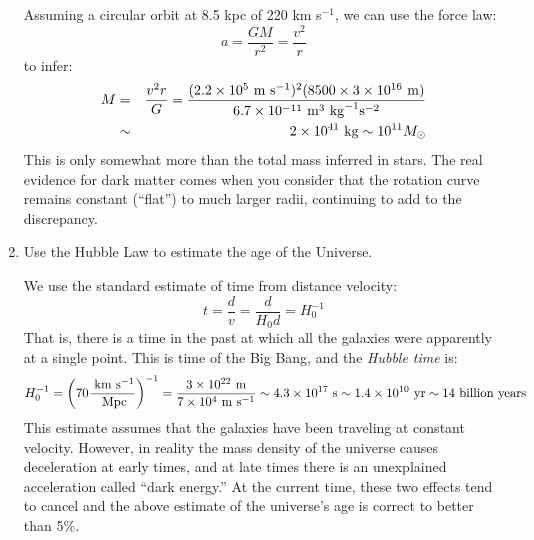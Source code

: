 \begin{enumerate}
\begin{answer}
  Assuming a circular orbit at 8.5 kpc of 220 km s$^{-1}$, we can use
  the force law:
  \begin{equation}
   a = \frac{GM}{r^2} = \frac{v^2}{r}
  \end{equation}
  to infer:
  \begin{eqnarray}
   M &=& \frac{v^2 r}{G} =  \frac{(2.2 \times 10^5 {\rm ~m} {\rm
       ~s}^{-1})^2 (8500 \times 3 \times 10^{16} {\rm ~m})}
   {6.7 \times 10^{-11} {\rm ~m}^3 {\rm ~kg}^{-1} {\rm s}^{-2}} \cr
   &\sim& 2\times 10^{41} {\rm ~kg} \sim 10^{11} M_\odot 
  \end{eqnarray}
  This is only somewhat more than the total mass inferred in stars. The
  real evidence for  dark matter comes when you consider that the
  rotation curve remains constant (``flat'') to much larger radii,
  continuing to add to the discrepancy.
\end{answer}
\item Use the Hubble Law to estimate the age of the Universe.

  \begin{answer}
    We use the standard estimate of time from distance velocity:
    \begin{equation}
      t = \frac{d}{v} = \frac{d}{H_0 d} = H_0^{-1}
    \end{equation}
    That is, there is a time in the past at which all the galaxies
    were apparently at a single point. This is time of the Big Bang,
    and the {\it Hubble time} is:
    \begin{equation}
      H_0^{-1} = \left(70 \frac{{\rm ~km} {\rm ~s}^{-1}}{{\rm
          ~Mpc}}\right)^{-1} =  \frac{3 \times 10^{22} {\rm ~m}}{7
        \times 10^4 {\rm ~m} {\rm ~s}^{-1}} \sim 4.3 \times 10^{17}
      {\rm ~s} \sim 1.4 \times 10^{10} {\rm ~yr} \sim 14 {\rm
        ~billion~years}
    \end{equation}
    This estimate assumes that the galaxies have been traveling at
    constant velocity. However, in reality the mass density of the
    universe causes deceleration at early times, and at late times
    there is an unexplained acceleration called ``dark energy.'' At
    the current time, these two effects tend to cancel and the above
    estimate of the universe's age is correct to better than 5\%.
  \end{answer}
\end{enumerate}   




  
